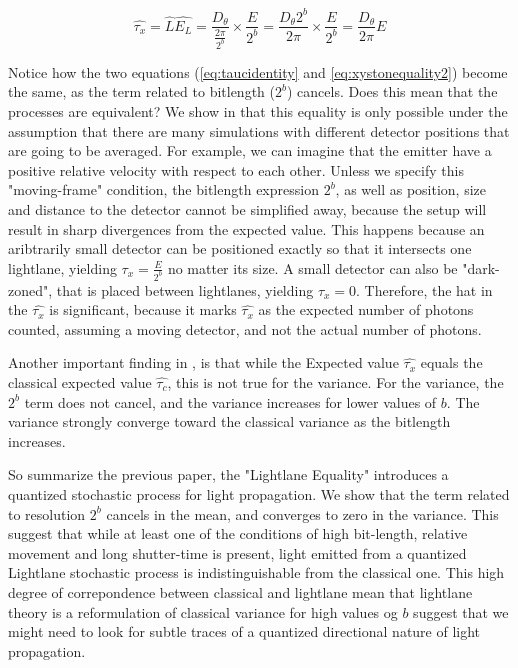 \documentclass[notitlepage]{article}
\begin{document}
\begin{equation}
 \hat{\tau_x }=  \hat{L} \hat{E_L}  =  \frac{D_\theta}{ \frac{2\pi}{2^b}}  \times	 \frac{E}{2^b} = \frac{D_\theta  2^b  }{2\pi} \times \frac{E}{2^b} =  \frac{D_\theta}{2 \pi}E
 \label{eq:xystonequality2}
\end{equation}

Notice how the two equations (\ref{eq:taucidentity}  and \ref{eq:xystonequality2}) become the same, as the term related to bitlength ($2^b$) cancels. Does this mean that the processes are equivalent? We show in \cite{RhadamantysA2} that this equality is only possible under the assumption that there are many simulations with different detector positions that are going to be averaged. For example, we can imagine that the emitter have a positive relative velocity with respect to each other. Unless we specify this "moving-frame" condition, the bitlength expression $2^b$, as well as position, size and distance to the detector cannot be simplified away, because the setup will result in sharp divergences from the expected value. This happens because an aribtrarily small detector can be positioned exactly so that it intersects one lightlane, yielding $\tau_x = \frac{E}{2^b}$ no matter its size. A small detector  can also be "dark-zoned", that is placed between lightlanes, yielding $\tau_x =0$.
Therefore, the hat in the $\hat{\tau_x}$ is significant, because it marks $\hat{\tau_x}$ as the expected number of photons counted, assuming a moving detector, and not the actual number of photons. 

Another important finding in \citep{RhadamantysA2}, is that while the Expected value $\hat{\tau_x}$ equals the classical expected value $\hat{\tau_c}$, this  is not true for the variance. For the variance, the $2^b$ term does not cancel, and the variance increases for lower values of $b$. The variance strongly converge toward the classical variance as the bitlength increases. 

So summarize the previous paper,  the "Lightlane Equality" \citep{RhadamantysA2} introduces a quantized stochastic process for light propagation. We show that  the term related to resolution $2^b$ cancels in the mean, and converges to zero in the variance. This suggest that while at least one of the conditions of high bit-length, relative movement and long shutter-time is present, light emitted from a quantized Lightlane stochastic process is indistinguishable from the classical one. This high degree of correpondence between classical and lightlane mean that lightlane theory is a reformulation of classical variance for high values og $b$ suggest that we might need to look for subtle traces of a quantized directional nature of light propagation.
\end{document}
